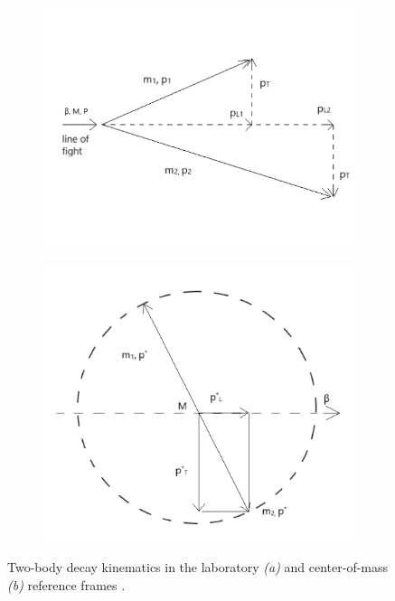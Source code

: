 \begin{figure}[t]
	\centering
	\begin{subfigure}{.45\textwidth}
		\includegraphics[height=.24\textheight]{graphics/04-event_selection/twobody_labframe.png}
		\caption{}
		\label{fig:4:twobody_labframe}
	\end{subfigure}
	\begin{subfigure}{.45\textwidth}
		\includegraphics[height=.24\textheight]{graphics/04-event_selection/twobody_cmframe.png}
		\caption{}
		\label{fig:4:twobody_cmframe}
	\end{subfigure}
	\caption{Two-body decay kinematics in the laboratory \textit{(a)} and center-of-mass \textit{(b)} reference frames \cite{armenteros_calibration}.}
	\label{fig:4:twobody_frames_ap}
\end{figure}

